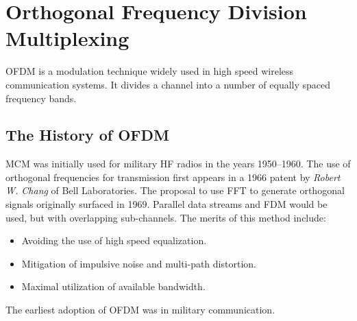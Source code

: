 \section{Orthogonal Frequency Division Multiplexing}

\gls{OFDM} is a modulation technique widely used in high speed wireless communication systems. It divides a channel into a number of equally spaced frequency bands.

\subsection{The History of OFDM}
\gls{MCM} was initially used for military \gls{HF} radios in the years 1950--1960. The use of orthogonal frequencies for transmission first appears in a 1966 patent by \emph{Robert W. Chang} of Bell Laboratories\cite{ofdm_intro}.
The proposal to use \gls{FFT} to generate orthogonal signals originally surfaced in 1969\cite{xploreHistory}. Parallel data streams and \gls{FDM} would be used, but with overlapping sub-channels. The merits of this method include:
\begin{itemize}
	\item Avoiding the use of high speed equalization.
	\item Mitigation of impulsive noise and multi-path distortion.
	\item Maximal utilization of available bandwidth.
\end{itemize}
The earliest adoption of OFDM was in military communication.
